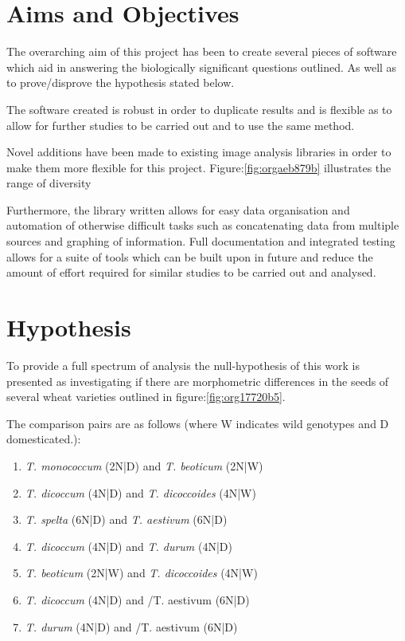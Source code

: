 \documentclass[11pt]{report}
\begin{document}
\section{Aims and Objectives}
\label{sec:org2c7ffd2}

The overarching aim of this project has been to create several pieces of software which aid in answering the biologically significant questions outlined. As well as to prove/disprove the hypothesis stated below.

The software created is robust in order to duplicate results and is flexible as to allow for further studies to be carried out and to use the same method.

Novel additions have been made to existing image analysis libraries in order to make them more flexible for this project. Figure:\ref{fig:orgaeb879b} illustrates the range of diversity

Furthermore, the library written allows for easy data organisation and automation of otherwise difficult tasks such as concatenating data from multiple sources and graphing of information. Full documentation and integrated testing allows for a suite of tools which can be built upon in future and reduce the amount of effort required for similar studies to be carried out and analysed.

\section{Hypothesis}
\label{sec:org13b92b0}
To provide a full spectrum of analysis the null-hypothesis of this work is presented as investigating if there are morphometric differences in the seeds of several wheat varieties outlined in figure:\ref{fig:org17720b5}.

The comparison pairs are as follows (where W indicates wild genotypes and D domesticated.):

\begin{enumerate}
\item \emph{T. monococcum} (2N|D) and \emph{T. beoticum} (2N|W)
\item \emph{T. dicoccum} (4N|D) and \emph{T. dicoccoides} (4N|W)
\item \emph{T. spelta} (6N|D) and \emph{T. aestivum} (6N|D)
\item \emph{T. dicoccum} (4N|D) and \emph{T. durum} (4N|D)
\item \emph{T. beoticum} (2N|W) and \emph{T. dicoccoides} (4N|W)
\item \emph{T. dicoccum} (4N|D) and /T. aestivum (6N|D)
\item \emph{T. durum} (4N|D) and /T. aestivum (6N|D)
\end{enumerate}
\end{document}

